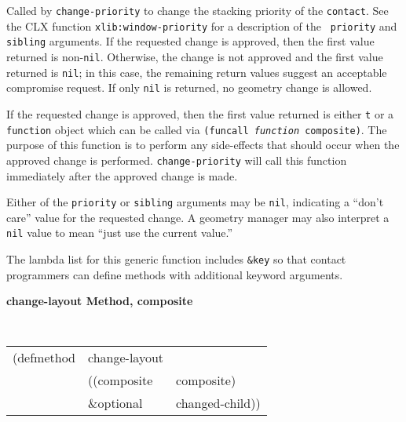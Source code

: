 \begin{flushright} \parbox[t]{6.125in}{
Called by {\tt change-priority}
to change the stacking priority of the {\tt contact}.
See the CLX function {\tt xlib:window-priority} for a description of the {\tt
priority} and {\tt sibling} arguments.
If the
requested change is approved, then the first value returned
is non-{\tt nil}.  Otherwise, the change is not approved and the first  value returned is
{\tt nil}; in this case, the remaining return values suggest an acceptable
compromise request.
If only {\tt nil} is returned, no geometry change is allowed.

\parbox[t]{6.125in}{ If the requested change is approved, then the first value
returned is either {\tt t} or a {\tt function} object which can be called via
{\tt (funcall {\em function} composite)}. The purpose of this function is to
perform any side-effects that should occur when the approved change is
performed. {\tt change-priority} will call this function immediately after the
approved change is made.}

Either of the {\tt priority} or {\tt sibling} 
arguments may be {\tt nil}, indicating a ``don't care'' value for the requested
change. A geometry manager may also interpret a {\tt nil} value to mean ``just
use the current value.''


The lambda list for this generic function includes {\tt \&key} so that contact
programmers can define methods with additional keyword arguments.
}\end{flushright}

{\samepage
{\large {\bf change-layout \hfill Method, composite}}
\begin{flushright} \parbox[t]{6.125in}{
\tt
\begin{tabular}{lll}
\raggedright
(defmethod & change-layout & \\
& ((composite  &composite) \\
&  \&optional & changed-child))
\end{tabular}
\rm

}\end{flushright}}

